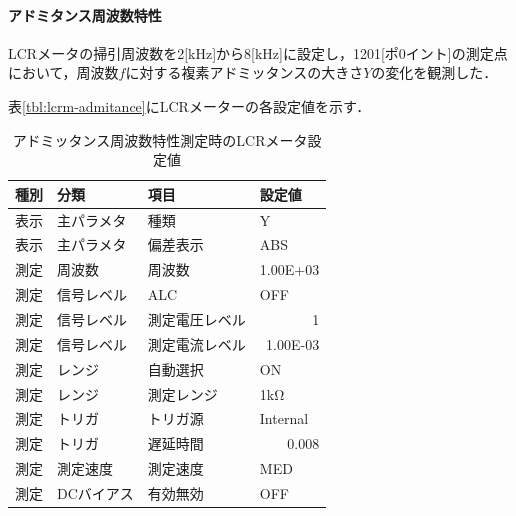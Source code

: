 \documentclass[dvipdfmx,titlepage,a4j]{jsarticle}  %
\numberwithin{equation}{section}
\begin{document}
\paragraph{アドミタンス周波数特性}
LCRメータの掃引周波数を2[kHz]から8[kHz]に設定し，1201[ポ0イント]の測定点において，周波数$f$に対する複素アドミッタンスの大きさ$Y$の変化を観測した．

表\ref{tbl:lcrm-admitance}にLCRメーターの各設定値を示す．

\begin{table}[H]
  \caption{アドミッタンス周波数特性測定時のLCRメータ設定値}
  \begin{center}
    \begin{tabular}{l|l|l|l}
      \hline
      種別           & 分類                          & 項目           & 設定値                       \\ \hline\hline
      表示           & 主パラメタ                    & 種類           & Y                            \\ \hline
      表示           & 主パラメタ                    & 偏差表示       & ABS                          \\ \hline
      測定           & 周波数                        & 周波数         & \multicolumn{1}{r}{1.00E+03} \\ \hline
      測定           & 信号レベル                    & ALC            & OFF                          \\ \hline
      測定           & 信号レベル                    & 測定電圧レベル & \multicolumn{1}{r}{1}        \\ \hline
      測定           & 信号レベル                    & 測定電流レベル & \multicolumn{1}{r}{1.00E-03} \\ \hline
      測定           & レンジ                        & 自動選択       & ON                           \\ \hline
      測定           & レンジ                        & 測定レンジ     & 1kΩ                          \\ \hline
      測定           & トリガ                        & トリガ源       & Internal                     \\ \hline
      測定           & トリガ                        & 遅延時間       & \multicolumn{1}{r}{0.008}    \\ \hline
      測定           & 測定速度                      & 測定速度       & MED                          \\ \hline
      測定           & DCバイアス                    & 有効無効       & OFF                          \\ \hline

\end{tabular}
\end{center}
\end{table}
\end{document}
